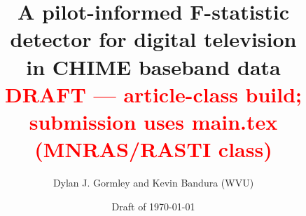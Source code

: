 \documentclass[11pt]{article}
\title{A pilot-informed F-statistic detector for digital television\\
in CHIME baseband data\\
\large\textcolor{red}{DRAFT --- article-class build; submission uses main.tex (MNRAS/RASTI class)}}
\author{Dylan J. Gormley and Kevin Bandura (WVU)}
\date{Draft of \today}
\begin{document}
\maketitle

\begin{abstract}

\end{abstract}






\appendix

\end{document}
